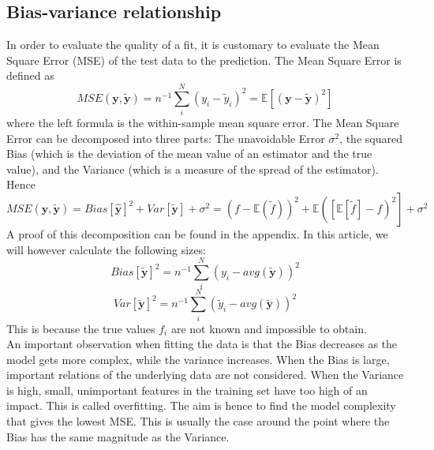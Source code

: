 \documentclass[11pt,a4paper]{article}
\begin{document}
\subsection{Bias-variance relationship}
In order to evaluate the quality of a fit, it is customary to evaluate the Mean Square Error (MSE) of the test data to the prediction. The Mean Square Error is defined as
\begin{equation*}
MSE(\bm{y},\bm{\tilde y})=n^{-1}\sum_i^N\left(y_i - \tilde y_i \right)^2=\mathbb{E}\left[(\bm{y}-\bm{\tilde y})^2  \right]
\end{equation*}
where the left formula is the within-sample mean square error.
The Mean Square Error can be decomposed into three parts: The unavoidable Error $\sigma^2$, the squared Bias (which is the deviation of the mean value of an estimator and the true value), and the Variance (which is a measure of the spread of the estimator). Hence
\begin{equation*}
MSE(\bm{y},\bm{\tilde y})=Bias[ \bm{\hat y}]^2 + Var[ \bm{\tilde y}]+\sigma^2= \left(f-\mathbb{E}(\tilde f)\right)^2 + \mathbb{E}\left(\left[\mathbb{E}\left[ \tilde f \right]-f\right)^2 \right]+\sigma^2
\end{equation*}
A proof of this decomposition can be found in the appendix.
In this article, we will however calculate the following sizes:
\begin{equation*}
Bias[\bm{\tilde y}]^2=n^{-1}\sum_i^N\left( y_i - avg( \bm{\tilde y})\right)^2
\end{equation*}
\begin{equation*}
Var[\bm{\tilde y}]^2=n^{-1}\sum_i^N\left(\tilde y_i - avg( \bm{\tilde y})\right)^2
\end{equation*}
This is because the true values $f_i$ are not known and impossible to obtain.\\
An important observation when fitting the data is that the Bias decreases as the model gets more complex, while the variance increases. When the Bias is large, important relations of the underlying data are not considered. When the Variance is high, small, unimportant features in the training set have too high of an impact. This is called overfitting. The aim is hence to find the model complexity that gives the lowest MSE. This is usually the case around the point where the Bias has the same magnitude as the Variance.
\end{document}
